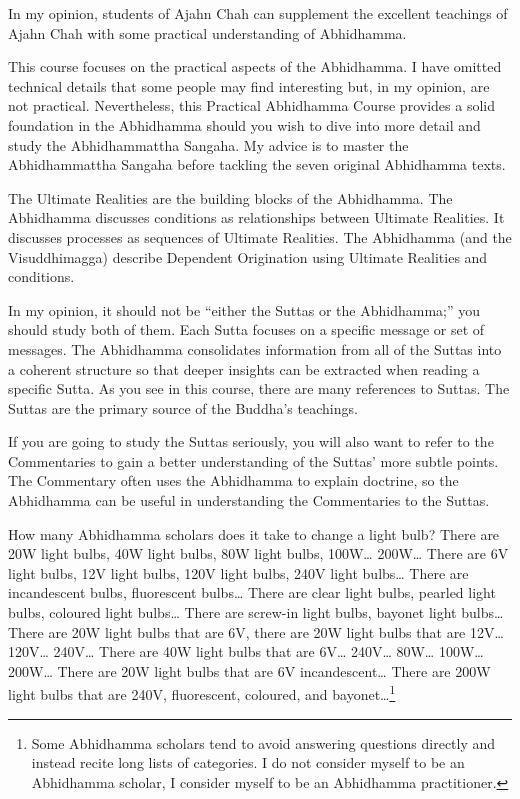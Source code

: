 In my opinion, students of Ajahn Chah can supplement the excellent teachings of Ajahn Chah with some practical understanding of Abhidhamma. 

This course focuses on the practical aspects of the Abhidhamma. I have omitted technical details that some people may find interesting but, in my opinion, are not practical. Nevertheless, this Practical Abhidhamma Course provides a solid foundation in the Abhidhamma should you wish to dive into more detail and study the Abhidhammattha Sangaha. My advice is to master the Abhidhammattha Sangaha before tackling the seven original Abhidhamma texts.


The Ultimate Realities are the building blocks of the Abhidhamma. The Abhidhamma discusses conditions as relationships between Ultimate Realities. It discusses processes as sequences of Ultimate Realities. The Abhidhamma (and the Visuddhimagga) describe Dependent Origination using Ultimate Realities and conditions.

\pagebreak


In my opinion, it should not be “either the Suttas or the Abhidhamma;” you should study both of them. Each Sutta focuses on a specific message or set of messages. The Abhidhamma consolidates information from all of the Suttas into a coherent structure so that deeper insights can be extracted when reading a specific Sutta. As you see in this course, there are many references to Suttas. The Suttas are the primary source of the Buddha’s teachings.

If you are going to study the Suttas seriously, you will also want to refer to the Commentaries to gain a better understanding of the Suttas' more subtle points. The Commentary often uses the Abhidhamma to explain doctrine, so the Abhidhamma can be useful in understanding the Commentaries to the Suttas.


How many Abhidhamma scholars does it take to change a light bulb? There are 20W light bulbs, 40W light bulbs, 80W light bulbs, 100W… 200W… There are 6V light bulbs, 12V light bulbs, 120V light bulbs, 240V light bulbs… There are incandescent bulbs, fluorescent bulbs… There are clear light bulbs, pearled light bulbs, coloured light bulbs… There are screw-in light bulbs, bayonet light bulbs… There are 20W light bulbs that are 6V, there are 20W light bulbs that are 12V… 120V… 240V… There are 40W light bulbs that are 6V… 240V… 80W… 100W… 200W… There are 20W light bulbs that are 6V incandescent… There are 200W light bulbs that are 240V, fluorescent, coloured, and bayonet…\footnote{Some Abhidhamma scholars tend to avoid answering questions directly and instead recite long lists of categories. I do not consider myself to be an Abhidhamma scholar, I consider myself to be an Abhidhamma practitioner.}
